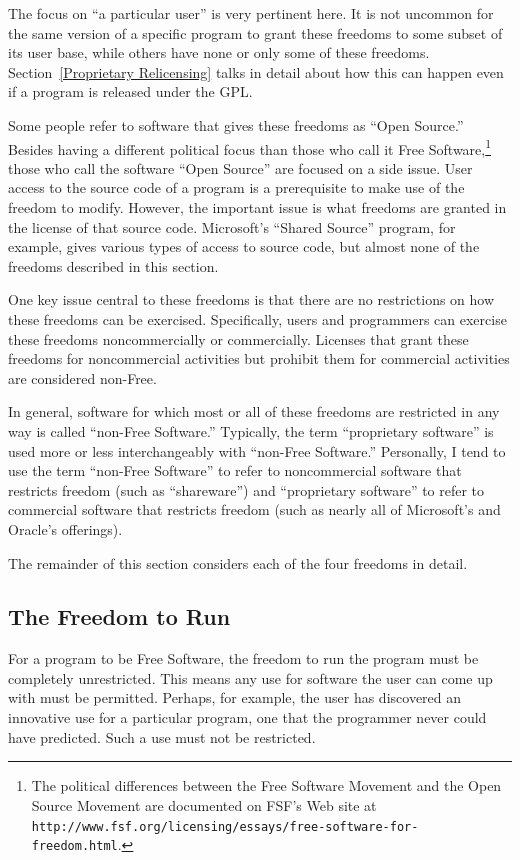 \documentclass[11pt, letterpaper]{book}
\begin{document}
The focus on ``a particular user'' is very pertinent here. It is not
uncommon for the same version of a specific program to grant these
freedoms to some subset of its user base, while others have none or only
some of these freedoms. Section~\ref{Proprietary Relicensing} talks in
detail about how this can happen even if a program is released under the
GPL\@.

Some people refer to software that gives these freedoms as ``Open
Source.''  Besides having a different political focus than those who
call it Free Software,\footnote{The political differences between the
  Free Software Movement and the Open Source Movement are documented
  on FSF's Web site at {\tt
    http://www.fsf.org/licensing/essays/free-software-for-freedom.html}.}
those who call the software ``Open Source'' are focused on a side
issue.  User access to the source code of a program is a prerequisite
to make use of the freedom to modify. However, the important issue is
what freedoms are granted in the license of that source code.
Microsoft's ``Shared Source'' program, for example, gives various
types of access to source code, but almost none of the freedoms
described in this section.

One key issue central to these freedoms is that there are no
restrictions on how these freedoms can be exercised. Specifically, users
and programmers can exercise these freedoms noncommercially or
commercially. Licenses that grant these freedoms for noncommercial
activities but prohibit them for commercial activities are considered
non-Free.

In general, software for which most or all of these freedoms are
restricted in any way is called ``non-Free Software.''  Typically, the
term ``proprietary software'' is used more or less interchangeably with
``non-Free Software.''  Personally, I tend to use the term ``non-Free
Software'' to refer to noncommercial software that restricts freedom
(such as ``shareware'') and ``proprietary software'' to refer to
commercial software that restricts freedom (such as nearly all of
Microsoft's and Oracle's offerings).

The remainder of this section considers each of the four freedoms in
detail.

\subsection{The Freedom to Run}

For a program to be Free Software, the freedom to run the program must
be completely unrestricted. This means any use for software the user
can come up with must be permitted. Perhaps, for example, the user
has discovered an innovative use for a particular program, one
that the programmer never could have predicted. Such a use must not
be restricted.
\end{document}
